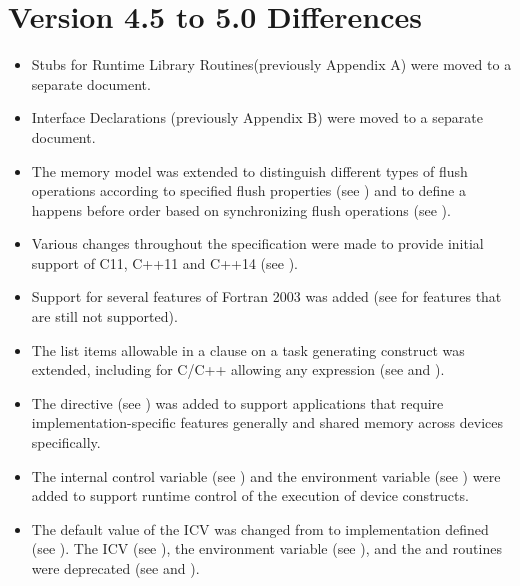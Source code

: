 \section{Version 4.5 to 5.0 Differences}
\label{sec:Version 4.5 to 5.0 Differences}
\begin{itemize}
\item Stubs for Runtime Library Routines(previously Appendix A) were moved to a separate document.
\item Interface Declarations (previously Appendix B) were moved to a separate document.

\item The memory model was extended to distinguish different types of flush
      operations according to specified flush properties (see
      ) and to define a happens
      before order based on synchronizing flush operations
      (see ).

\item Various changes throughout the specification were made to provide
      initial support of C11, C++11 and C++14 (see
      ).

\item Support for several features of Fortran 2003 was added (see
       for features that are still
      not supported).

\item The list items allowable in a  clause on a task generating
      construct was extended, including for C/C++ allowing any 
      expression (see  and
      ).

\item The  directive (see ) was
      added to support applications that require implementation-specific
      features generally and shared memory across devices specifically.

\item The  internal control variable (see
      ) and the
       environment variable (see
      ) were added to support runtime
      control of the execution of device constructs.

\item The default value of the  ICV was changed from 
      to implementation defined (see ).
      The  ICV (see ), the
       environment variable (see ),
      and the  and  routines
      were deprecated (see  and
      ).


\end{itemize}
